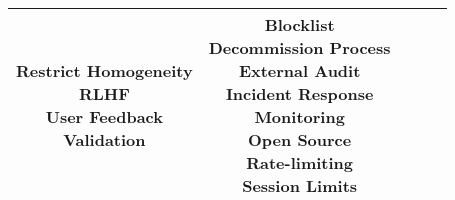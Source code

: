 \documentclass[fleqn]{article}
\begin{document}
\begin{landscape}
\begin{table}[H]
\begin{tabular}{|c|c|c|c|c|}
{			\textbullet\hspace{3pt} Restrict Homogeneity\\ 			
			\textbullet\hspace{3pt} RLHF\\ 
			\textbullet\hspace{3pt} User Feedback\\ 
			\textbullet\hspace{3pt} Validation\\ 							 	 
		}
		& \makecell[l]{
			\textbullet\hspace{3pt} Blocklist \\ 	
			\textbullet\hspace{3pt} Decommission Process\\ 	
			\textbullet\hspace{3pt} External Audit\\ 
			\textbullet\hspace{3pt} Incident Response\\  
			\textbullet\hspace{3pt} Monitoring\\ 	
			\textbullet\hspace{3pt} Open Source\\
			\textbullet\hspace{3pt} Rate-limiting \\ 
			\textbullet\hspace{3pt} Session Limits\\ 				 	 
		} \\
		\hline
	\end{tabular}
	\label{table:med_risk_plan_by_gai_risk_cont}
\end{table}

\vfill
\raisebox{-10pt}{\makebox[\linewidth]{\thepage}}

\pagebreak
\thispagestyle{empty}


\end{landscape}
\end{document}
